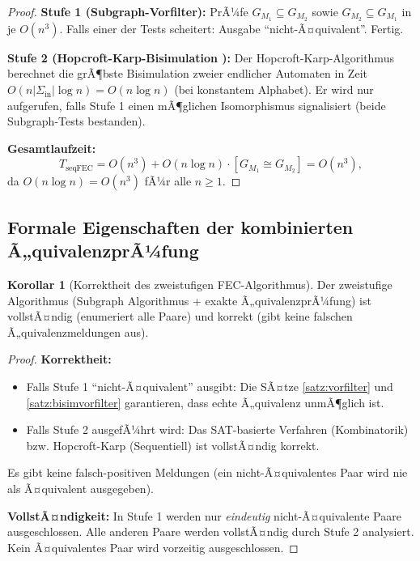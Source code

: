 ﻿\documentclass[a4paper,12pt]{article}
\theoremstyle{definition}
\newtheorem{korollar}{Korollar}
\begin{document}
\begin{proof}
  \textbf{Stufe 1 (Subgraph-Vorfilter):}
  PrÃ¼fe $G_{M_1} \subseteq G_{M_2}$ sowie $G_{M_2} \subseteq G_{M_1}$ in je $O(n^3)$.
  Falls einer der Tests scheitert: Ausgabe ``nicht-Ã¤quivalent''. Fertig.

  \textbf{Stufe 2 (Hopcroft-Karp-Bisimulation \cite{hopcroft1971}):}
  Der Hopcroft-Karp-Algorithmus berechnet die grÃ¶bste Bisimulation zweier endlicher
  Automaten in Zeit $O(n |\Sigma_{\text{in}}| \log n) = O(n \log n)$ (bei konstantem
  Alphabet). Er wird nur aufgerufen, falls Stufe 1 einen mÃ¶glichen Isomorphismus
  signalisiert (beide Subgraph-Tests bestanden).

  \textbf{Gesamtlaufzeit:}
  \[
    T_{\text{seqFEC}} = O(n^3) + O(n \log n) \cdot [G_{M_1} \cong G_{M_2}]
    = O(n^3),
  \]
  da $O(n \log n) = O(n^3)$ fÃ¼r alle $n \geq 1$.
\end{proof}

\subsection{Formale Eigenschaften der kombinierten Ã„quivalenzprÃ¼fung}

\begin{korollar}[Korrektheit des zweistufigen FEC-Algorithmus]\label{kor:feckorrekt}
  Der zweistufige Algorithmus (Subgraph Algorithmus + exakte Ã„quivalenzprÃ¼fung) ist
  vollstÃ¤ndig (enumeriert alle Paare) und korrekt (gibt keine falschen Ã„quivalenzmeldungen
  aus).
\end{korollar}

\begin{proof}
  \textbf{Korrektheit:}
  \begin{itemize}
    \item Falls Stufe 1 ``nicht-Ã¤quivalent'' ausgibt: Die SÃ¤tze \ref{satz:vorfilter}
          und \ref{satz:bisimvorfilter} garantieren, dass echte Ã„quivalenz unmÃ¶glich ist.
    \item Falls Stufe 2 ausgefÃ¼hrt wird: Das SAT-basierte Verfahren (Kombinatorik) bzw.
          Hopcroft-Karp (Sequentiell) ist vollstÃ¤ndig korrekt.
  \end{itemize}
  Es gibt keine falsch-positiven Meldungen (ein nicht-Ã¤quivalentes Paar wird nie als
  Ã¤quivalent ausgegeben).

  \textbf{VollstÃ¤ndigkeit:} In Stufe 1 werden nur \emph{eindeutig} nicht-Ã¤quivalente
  Paare ausgeschlossen. Alle anderen Paare werden vollstÃ¤ndig durch Stufe 2 analysiert.
  Kein Ã¤quivalentes Paar wird vorzeitig ausgeschlossen.
\end{proof}
\end{document}
